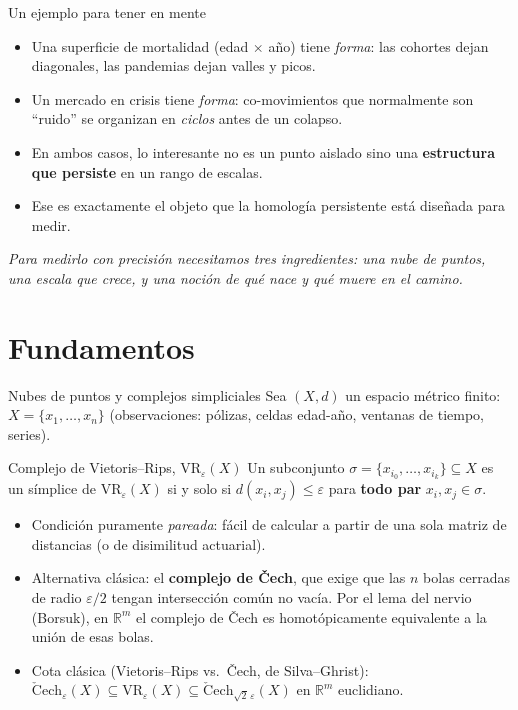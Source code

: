\documentclass[aspectratio=169,11pt]{beamer}
\newcommand{\defterm}[1]{\textbf{\color{accent}#1}}
\begin{document}
\begin{frame}{Un ejemplo para tener en mente}
  \begin{itemize}
    \item Una superficie de mortalidad (edad $\times$ año) tiene
      \emph{forma}: las cohortes dejan diagonales, las pandemias dejan
      valles y picos.
    \item Un mercado en crisis tiene \emph{forma}: co-movimientos que
      normalmente son ``ruido'' se organizan en \emph{ciclos} antes de un
      colapso.
    \item En ambos casos, lo interesante no es un punto aislado sino una
      \textbf{estructura que persiste} en un rango de escalas.
    \item Ese es exactamente el objeto que la homología persistente está
      diseñada para medir.
  \end{itemize}
  \vspace{0.8em}
  {\small\itshape\color{muted}
  Para medirlo con precisión necesitamos tres ingredientes: una nube de
  puntos, una escala que crece, y una noción de qué nace y qué muere en
  el camino.}
\end{frame}

\section{Fundamentos}
\begin{frame}{Nubes de puntos y complejos simpliciales}
  Sea $(X,d)$ un espacio métrico finito: $X=\{x_1,\dots,x_n\}$
  (observaciones: pólizas, celdas edad-año, ventanas de tiempo, series).
  \vspace{0.4em}
  \begin{block}{Complejo de Vietoris--Rips, $\mathrm{VR}_\varepsilon(X)$}
    Un subconjunto $\sigma=\{x_{i_0},\dots,x_{i_k}\}\subseteq X$ es un
    símplice de $\mathrm{VR}_\varepsilon(X)$ si y solo si
    $d(x_i,x_j)\le \varepsilon$ para \textbf{todo par} $x_i,x_j\in\sigma$.
  \end{block}
  \begin{itemize}
    \item Condición puramente \emph{pareada}: fácil de calcular a partir de
      una sola matriz de distancias (o de disimilitud actuarial).
    \item Alternativa clásica: el \defterm{complejo de Čech}, que exige que
      las $n$ bolas cerradas de radio $\varepsilon/2$ tengan intersección
      común no vacía. Por el lema del nervio (Borsuk), en $\mathbb{R}^m$ el
      complejo de Čech es homotópicamente equivalente a la unión de esas
      bolas.
    \item Cota clásica (Vietoris--Rips vs.\ Čech, de Silva--Ghrist):
      $\mathrm{\check{C}ech}_\varepsilon(X)\subseteq \mathrm{VR}_\varepsilon(X)
      \subseteq \mathrm{\check{C}ech}_{\sqrt{2}\,\varepsilon}(X)$ en
      $\mathbb{R}^m$ euclidiano.
  \end{itemize}
\end{frame}
\end{document}
